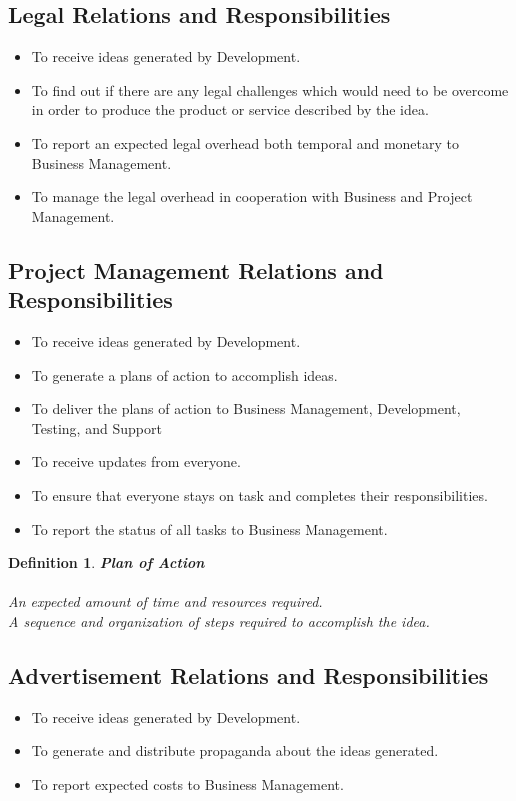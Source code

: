 \documentclass[12pt]{extarticle}
\theoremstyle{plain}
\theoremstyle{plain}
\theoremstyle{plain}
\theoremstyle{Definition}
\newtheorem{def.}{Definition}[section]
\theoremstyle{Definition}
\theoremstyle{Definition}
\theoremstyle{plain}
\theoremstyle{plain}
\begin{document}
	\subsection{Legal Relations and Responsibilities}
		\begin{itemize}
			\item To receive ideas generated by Development. 
			\item To find out if there are any legal challenges which would need to be overcome in order to produce the product or service described by the idea. 
			\item To report an expected legal overhead both temporal and monetary to Business Management. 
			\item To manage the legal overhead in cooperation with Business and Project Management. 
		\end{itemize}
	\subsection{Project Management Relations and Responsibilities}
		\begin{itemize}
			\item To receive ideas generated by Development. 
			\item To generate a plans of action to accomplish ideas. 
			\item To deliver the plans of action to Business Management, Development, Testing, and Support 
			\item To receive updates from everyone. 
			\item To ensure that everyone stays on task and completes their responsibilities. 
			\item To report the status of all tasks to Business Management. 
		\end{itemize}
		\begin{def.} \textbf{Plan of Action} \\ \\
			An expected amount of time and resources required. \\ 
			A sequence and organization of steps required to accomplish the idea. 
		\end{def.}
	\subsection{Advertisement Relations and Responsibilities}
		\begin{itemize}
			\item To receive ideas generated by Development. 
			\item To generate and distribute propaganda about the ideas generated. 
			\item To report expected costs to Business Management. 
		\end{itemize}
\end{document}
